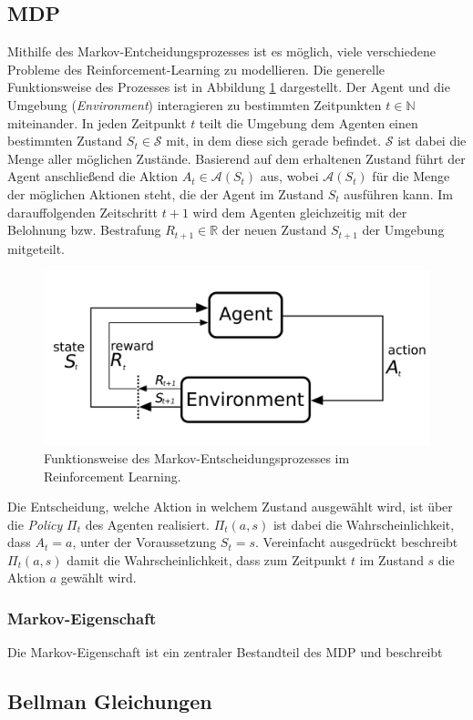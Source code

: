 \subsection{\acf{MDP}}

Mithilfe des Markov-Entcheidungsprozesses ist es möglich, viele verschiedene Probleme des Reinforcement-Learning zu modellieren. Die generelle Funktionsweise des Prozesses ist in Abbildung \ref{fig.basics:rl:mdp} dargestellt.
Der Agent und die Umgebung (\textit{Environment}) interagieren zu bestimmten Zeitpunkten $t \in \mathbb{N}$ miteinander. In jeden Zeitpunkt $t$ teilt die Umgebung dem Agenten einen bestimmten Zustand $S_t \in \mathcal{S}$ mit, in dem diese sich gerade befindet.
$\mathcal{S}$ ist dabei die Menge aller möglichen Zustände.
Basierend auf dem erhaltenen Zustand führt der Agent anschließend die Aktion $A_t \in \mathcal{A}(S_t)$ aus, wobei $\mathcal{A}(S_t)$ für die Menge der möglichen Aktionen steht, die der Agent im Zustand $S_t$ ausführen kann.
Im darauffolgenden Zeitschritt $t + 1$ wird dem Agenten gleichzeitig mit der Belohnung bzw. Bestrafung $R_{t+1} \in \mathbb{R}$ der neuen Zustand $S_{t+1}$ der Umgebung mitgeteilt.

\begin{figure}[ht!]
	\centering
	\includegraphics[scale=0.2]{Bilder/markov_diagram}
	\caption{Funktionsweise des Markov-Entscheidungsprozesses im Reinforcement Learning.}
	\label{fig.basics:rl:mdp}
\end{figure}

Die Entscheidung, welche Aktion in welchem Zustand ausgewählt wird, ist über die \textit{Policy} $\Pi_t$ des Agenten realisiert. $\Pi_t(a, s)$ ist dabei die Wahrscheinlichkeit, dass $A_t = a$, unter der Voraussetzung $S_t = s$. Vereinfacht ausgedrückt beschreibt $\Pi_t(a, s)$ damit die Wahrscheinlichkeit, dass zum Zeitpunkt $t$ im Zustand $s$ die Aktion $a$ gewählt wird.



\subsubsection{Markov-Eigenschaft}

Die Markov-Eigenschaft ist ein zentraler Bestandteil des \ac{MDP} und beschreibt 

\subsection{Bellman Gleichungen}

\section{}